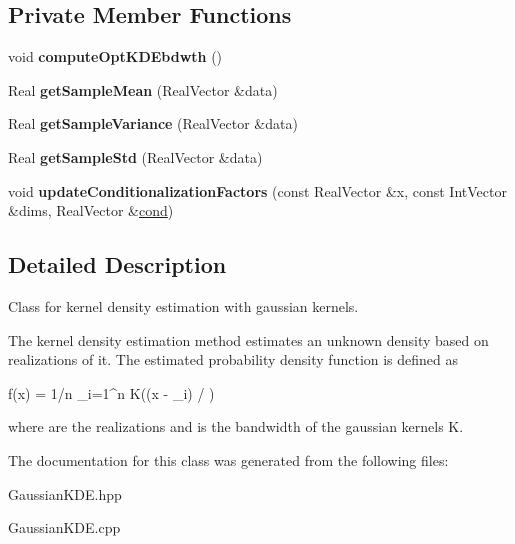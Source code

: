 \subsection*{Private Member Functions}
\begin{DoxyCompactItemize}
\item 
void {\bfseries compute\+Opt\+K\+D\+Ebdwth} ()\label{classPecos_1_1GaussianKDE_a27334457001c0b2ba4f58f1929283c45}

\item 
Real {\bfseries get\+Sample\+Mean} (Real\+Vector \&data)\label{classPecos_1_1GaussianKDE_aadbe1281c7c72f3bba5f5aed94af15cb}

\item 
Real {\bfseries get\+Sample\+Variance} (Real\+Vector \&data)\label{classPecos_1_1GaussianKDE_a38336a67976bfe7d1a742980c0f4fd43}

\item 
Real {\bfseries get\+Sample\+Std} (Real\+Vector \&data)\label{classPecos_1_1GaussianKDE_a4ba0ba01844d6d2658e2dcf05163e055}

\item 
void {\bfseries update\+Conditionalization\+Factors} (const Real\+Vector \&x, const Int\+Vector \&dims, Real\+Vector \&\hyperlink{classPecos_1_1GaussianKDE_acbd955dd6b64ad6b463d823e3f97d2ae}{cond})\label{classPecos_1_1GaussianKDE_ad2ff8fa62b5e017a72d2cef1f51c2b37}

\end{DoxyCompactItemize}


\subsection{Detailed Description}
Class for kernel density estimation with gaussian kernels. 

The kernel density estimation method estimates an unknown density based on realizations of it. The estimated probability density function is defined as \begin{DoxyVerb}   f(x) = 1/n \sum_{i=1}^n K((x - \mu_i) / \sigma)
\end{DoxyVerb}


where  are the realizations and  is the bandwidth of the gaussian kernels K. 

The documentation for this class was generated from the following files\+:\begin{DoxyCompactItemize}
\item 
Gaussian\+K\+D\+E.\+hpp\item 
Gaussian\+K\+D\+E.\+cpp\end{DoxyCompactItemize}
